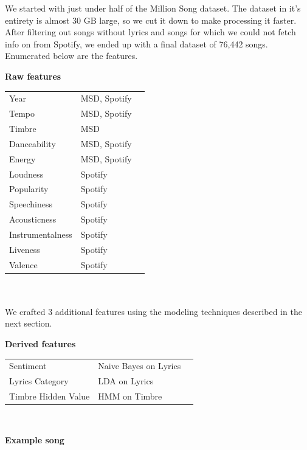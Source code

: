 \documentclass[acmtog]{acmart}
\begin{document}
We started with just under half of the Million Song dataset. The dataset in it's entirety is almost 30 GB large, so we cut it down to make processing it faster. After filtering out songs without lyrics and songs for which we could not fetch info on from Spotify, we ended up with a final dataset of 76,442 songs. Enumerated below are the features.
\\
\begin{center} \textbf{Raw features} \end{center}
\begin{tabular}{lll}
Year              & MSD, Spotify    \\
Tempo             & MSD, Spotify    \\
Timbre            & MSD             \\
Danceability      & MSD, Spotify    \\
Energy            & MSD, Spotify    \\
Loudness          & Spotify         \\
Popularity        & Spotify         \\
Speechiness       & Spotify         \\
Acousticness      & Spotify         \\
Instrumentalness  & Spotify         \\
Liveness          & Spotify         \\
Valence           & Spotify         \\
\end{tabular}
\\\\
We crafted 3 additional features using the modeling techniques described in the next section.
\begin{center} \textbf{Derived features} \end{center}
\begin{tabular}{lll}
Sentiment             & Naive Bayes on Lyrics   \\
Lyrics Category       & LDA on Lyrics           \\
Timbre Hidden Value   & HMM on Timbre           \\
\end{tabular}
\\
\begin{center} \textbf{Example song} \end{center}
\end{document}
